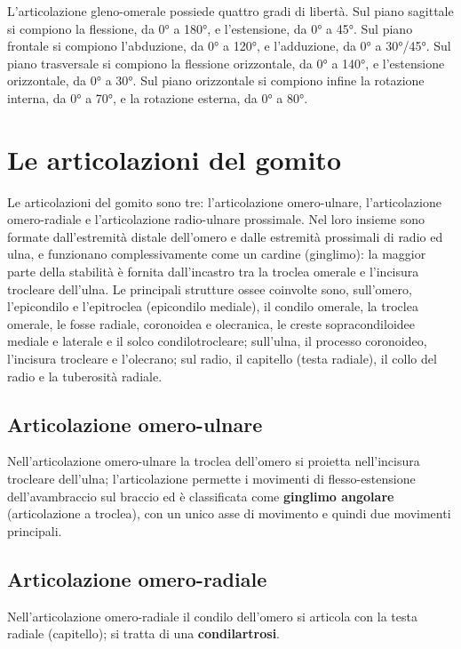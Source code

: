 L'articolazione gleno-omerale possiede quattro gradi di libertà. Sul piano
sagittale si compiono la flessione, da 0° a 180°, e l'estensione, da 0° a
45°. Sul piano frontale si compiono l'abduzione, da 0° a 120°, e
l'adduzione, da 0° a 30°/45°. Sul piano trasversale si compiono la
flessione orizzontale, da 0° a 140°, e l'estensione orizzontale, da 0° a
30°. Sul piano orizzontale si compiono infine la rotazione interna, da 0°
a 70°, e la rotazione esterna, da 0° a 80°.

\section{Le articolazioni del gomito}

Le articolazioni del gomito sono tre: l'articolazione omero-ulnare,
l'articolazione omero-radiale e l'articolazione radio-ulnare prossimale.
Nel loro insieme sono formate dall'estremità distale dell'omero e dalle
estremità prossimali di radio ed ulna, e funzionano complessivamente come
un cardine (ginglimo): la maggior parte della stabilità è fornita
dall'incastro tra la troclea omerale e l'incisura trocleare dell'ulna. Le
principali strutture ossee coinvolte sono, sull'omero, l'epicondilo e
l'epitroclea (epicondilo mediale), il condilo omerale, la troclea omerale,
le fosse radiale, coronoidea e olecranica, le creste sopracondiloidee
mediale e laterale e il solco condilotrocleare; sull'ulna, il processo
coronoideo, l'incisura trocleare e l'olecrano; sul radio, il capitello
(testa radiale), il collo del radio e la tuberosità radiale.

\subsection{Articolazione omero-ulnare}

Nell'articolazione omero-ulnare la troclea dell'omero si proietta
nell'incisura trocleare dell'ulna; l'articolazione permette i movimenti di
flesso-estensione dell'avambraccio sul braccio ed è classificata come
\textbf{ginglimo angolare} (articolazione a troclea), con un unico asse di
movimento e quindi due movimenti principali.

\subsection{Articolazione omero-radiale}

Nell'articolazione omero-radiale il condilo dell'omero si articola con la
testa radiale (capitello); si tratta di una \textbf{condilartrosi}.

